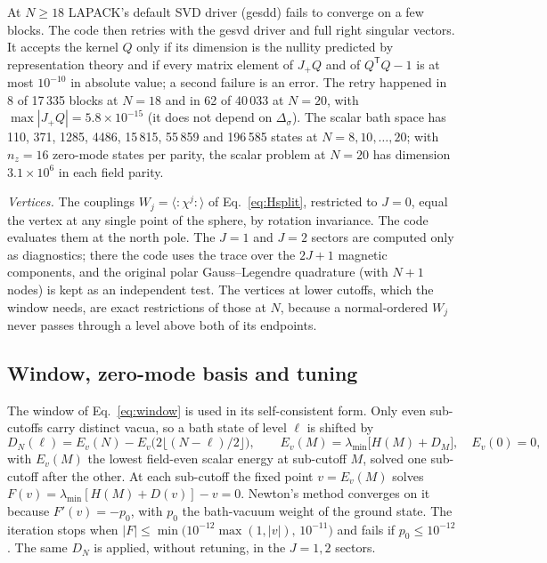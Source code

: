 At $N\geq18$ LAPACK's default SVD driver (gesdd) fails to converge on a few blocks. The code then retries with the
gesvd driver and full right singular vectors. It accepts the kernel $Q$ only if its dimension is the nullity
predicted by representation theory and if every matrix element of $J_+Q$ and of $Q^{\mathsf T}Q-1$ is at most
$10^{-10}$ in absolute value; a second failure is an error. The retry happened in 8 of 17\,335 blocks at $N=18$ and
in 62 of 40\,033 at $N=20$, with $\max|J_+Q|=5.8\times10^{-15}$ %
(it does not depend on $\Delta_\sigma$). The scalar bath space has 110, 371, 1285, 4486, 15\,815, 55\,859 and
196\,585 states at $N=8,10,\dots,20$; %
with $n_z=16$ zero-mode states per parity, the scalar problem at $N=20$ has dimension $3.1\times10^6$ in each field
parity.

\textit{Vertices.} The couplings $W_j=\langle{:}\chi^j{:}\rangle$ of Eq.~\eqref{eq:Hsplit}, restricted to $J=0$,
equal the vertex at any single point of the sphere, by rotation invariance. The code evaluates them at the north
pole. The $J=1$ and $J=2$ sectors are computed only as diagnostics; there the code uses the trace over the $2J+1$
magnetic components, and the original polar Gauss--Legendre quadrature (with $N+1$ nodes) is kept as an independent
test. The vertices at lower cutoffs, which the window needs, are exact restrictions of those at $N$, because a
normal-ordered $W_j$ never passes through a level above both of its endpoints.

\subsection{Window, zero-mode basis and tuning}\label{d3:window}

The window of Eq.~\eqref{eq:window} is used in its self-consistent form. Only even sub-cutoffs carry distinct
vacua, so a bath state of level $\ell$ is shifted by
\begin{equation}
 D_N(\ell)=E_v(N)-E_v\big(2\lfloor(N-\ell)/2\rfloor\big),\qquad E_v(M)=\lambda_{\min}\big[H(M)+D_M\big],\quad E_v(0)=0 ,
 \label{d3:window-floor}
\end{equation}
with $E_v(M)$ the lowest field-even scalar energy at sub-cutoff $M$, solved one sub-cutoff after the other. At each
sub-cutoff the fixed point $v=E_v(M)$ solves $F(v)=\lambda_{\min}[H(M)+D(v)]-v=0$. Newton's method converges on it
because $F'(v)=-p_0$, with $p_0$ the bath-vacuum weight of the ground state. The iteration stops when
$|F|\leq\min\big(10^{-12}\max(1,|v|),\,10^{-11}\big)$ and fails if $p_0\leq10^{-12}$. The same $D_N$ is applied,
without retuning, in the $J=1,2$ sectors.

